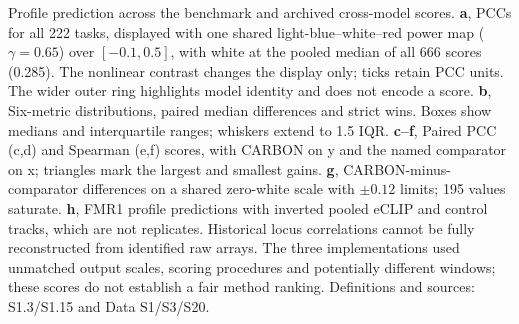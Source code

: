 \caption{Profile prediction across the benchmark and archived cross-model scores. \textbf{a}, PCCs for all 222 tasks, displayed with one shared light-blue--white--red power map ($\gamma=0.65$) over $[-0.1,0.5]$, with white at the pooled median of all 666 scores (0.285). The nonlinear contrast changes the display only; ticks retain PCC units. The wider outer ring highlights model identity and does not encode a score. \textbf{b}, Six-metric distributions, paired median differences and strict wins. Boxes show medians and interquartile ranges; whiskers extend to 1.5 IQR. \textbf{c--f}, Paired PCC (c,d) and Spearman (e,f) scores, with CARBON on y and the named comparator on x; triangles mark the largest and smallest gains. \textbf{g}, CARBON-minus-comparator differences on a shared zero-white scale with $\pm0.12$ limits; 195 values saturate. \textbf{h}, FMR1 profile predictions with inverted pooled eCLIP and control tracks, which are not replicates. Historical locus correlations cannot be fully reconstructed from identified raw arrays. The three implementations used unmatched output scales, scoring procedures and potentially different windows; these scores do not establish a fair method ranking. Definitions and sources: S1.3/S1.15 and Data S1/S3/S20.}
